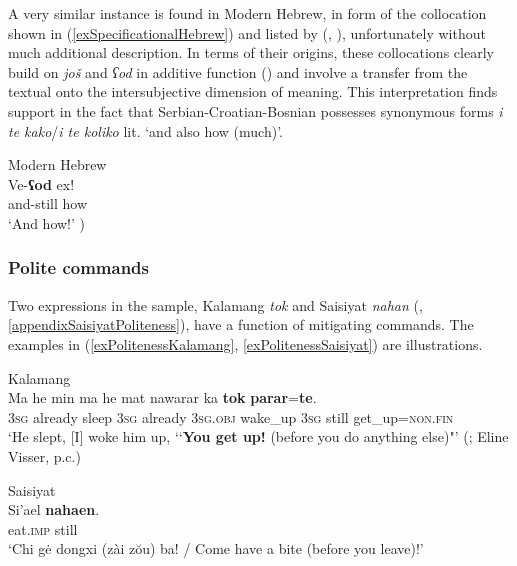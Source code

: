 A very similar instance is found in Modern Hebrew, in form of the collocation shown in (\ref{exSpecificationalHebrew}) and listed by \citeauthor{Glinert1976} (\citeyear{Glinert1976}, \citeyear[282]{Glinert1989}), unfortunately without much additional description. In terms of their origins, these collocations clearly build on \textit{još} and \textit{ʕod} in additive function () and involve a transfer from the textual onto the intersubjective dimension of meaning. This interpretation finds support in the fact that Serbian-Croatian-Bosnian possesses synonymous forms \textit{i te kako}/\textit{i te koliko} lit. \lq and also how (much)\rq{}.

\begin{exe}
	\ex Modern Hebrew\label{exSpecificationalHebrew}\\
	\gll Ve-\textbf{ʕod} ex!\\
	and-still how\\
	\glt \lq And how!\rq{ }\parencite[282]{Glinert1989})
\end{exe}

\subsubsection{Polite commands}\label{sectionPoliteness}
Two expressions in the sample, Kalamang \textit{tok} and Saisiyat \textit{nahan} (, \ref{appendixSaisiyatPoliteness}), have a function of mitigating commands. The examples in (\ref{exPolitenessKalamang}, \ref{exPolitenessSaisiyat}) are illustrations.

\begin{exe}
	\ex Kalamang\label{exPolitenessKalamang}\\
	\gll Ma he min ma he mat nawarar ka \textbf{tok} \textbf{parar}=\textbf{te}.\\
	3\textsc{sg} already sleep 3\textsc{sg} already 3\textsc{sg}.\textsc{obj} wake\_up 3\textsc{sg} still get\_up=\textsc{non}.\textsc{fin}\\
	\glt \lq He slept, [I] woke him up, \lq\lq \textbf{You get up!} (before you do anything else)"' (\cite{Visser2021a}; Eline Visser, p.c.)
	
	\ex Saisiyat\label{exPolitenessSaisiyat}\\
	\gll Si\rq{}ael \textbf{nahaen}.\\
	eat.\textsc{imp} still\\
	\glt \lq Chi gė dongxi (zài zŏu) ba! / Come have a bite (before you leave)!\rq{ }\parencite[120]{Huang2008}
\end{exe}

